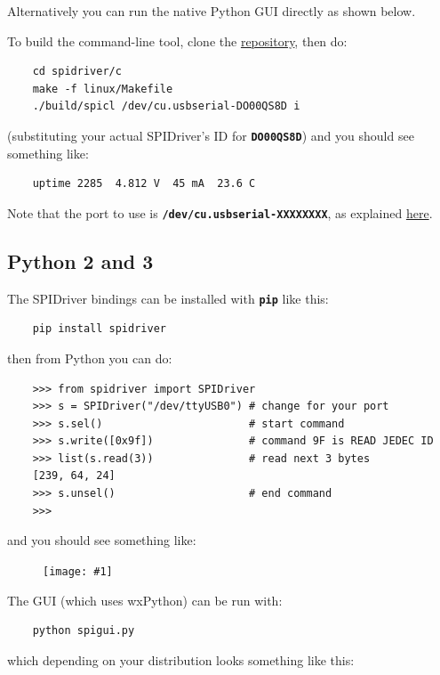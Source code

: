 \documentclass{article}
\newcommand{\png}[1]{
\begin{figure}[H]
\begin{center}
\texttt{[image: \#1]}
\end{center}
\end{figure}
}
\newcommand{\mach}[1]{\texttt{\textbf{#1}}}
\begin{document}
Alternatively you can run the native Python GUI directly as shown below.

To  build the command-line tool, clone the
\href{https://github.com/jamesbowman/spidriver}{repository}, then do:

\begin{lstlisting}
    cd spidriver/c
    make -f linux/Makefile
    ./build/spicl /dev/cu.usbserial-DO00QS8D i
\end{lstlisting}

(substituting your actual SPIDriver's ID for \mach{DO00QS8D})
and you should see something like:
\begin{lstlisting}
    uptime 2285  4.812 V  45 mA  23.6 C
\end{lstlisting}

Note that the port to use is \mach{/dev/cu.usbserial-XXXXXXXX}, as explained
\href{https://pbxbook.com/other/mac-tty.html}{here}.

\subsection{Python 2 and 3}

The SPIDriver bindings can be installed with \mach{pip} like this:

\begin{lstlisting}
    pip install spidriver
\end{lstlisting}

then from Python you can do:

\begin{lstlisting}
    >>> from spidriver import SPIDriver
    >>> s = SPIDriver("/dev/ttyUSB0") # change for your port
    >>> s.sel()                       # start command
    >>> s.write([0x9f])               # command 9F is READ JEDEC ID 
    >>> list(s.read(3))               # read next 3 bytes
    [239, 64, 24]
    >>> s.unsel()                     # end command
    >>>
\end{lstlisting}

and you should see something like:

\png{img/spidriver/spidriver-flash}

The GUI (which uses wxPython) can be run with:

\begin{lstlisting}
    python spigui.py
\end{lstlisting}

which depending on your distribution looks something like this:
\end{document}
